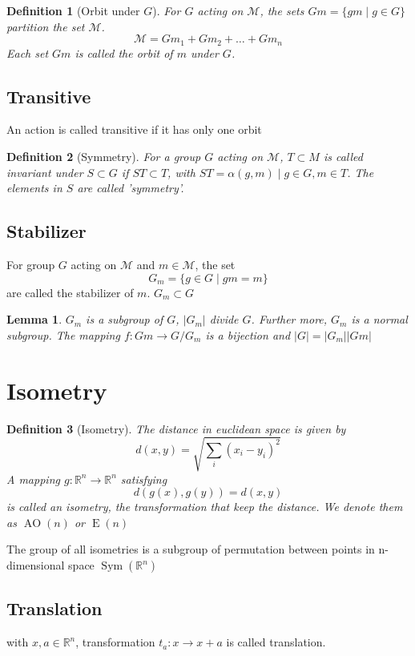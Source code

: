 \documentclass{amsart}
\newcommand{\setM}{\mathcal{M}}
\newtheorem{definition}{Definition}
\newtheorem{lemma}{Lemma}
\DeclareMathOperator{\AO}{AO}
\DeclareMathOperator{\E}{E}
\DeclareMathOperator{\Sym}{Sym}
\begin{document}
\begin{definition}
    [Orbit under $G$]
    For $G$ acting on $\setM$, the sets $Gm = \{gm\mid g\in G\}$ partition the set $\setM$. 
    \[\setM = Gm_1 + Gm_2 + \dots + Gm_n\]
    Each set $Gm$ is called the orbit of $m$ under $G$.
\end{definition}

\subsection*{Transitive}
An action is called transitive if it has only one orbit

\begin{definition}
    [Symmetry]
    For a group $G$ acting on $\setM$, $T\subset M$ is called invariant under $S \subset G$ if $ST\subset T$, 
    with $ST = {\alpha(g,m)\mid g \in G, m\in T}$. 
    The elements in $S$ are called 'symmetry'.
\end{definition}

\subsection*{Stabilizer}
For group $G$ acting on $\setM$ and $m \in \setM$, the set 
\[G_m = \{ g\in G\mid gm = m \}\]
are called the stabilizer of $m$. $G_m \subset G$

\begin{lemma}
    $G_m$ is a subgroup of $G$, $|G_m|$ divide $G$. Further more, $G_m$ is a normal subgroup. 
    The mapping $f\colon Gm \to G/G_m$ is a bijection and $|G|=|G_m||Gm|$
\end{lemma}

\section{Isometry}

\begin{definition}
    [Isometry]
    The distance in euclidean space is given by 
    \[
        d(x,y) = \sqrt{\sum_i(x_i-y_i)^2}    
    \]
    A mapping $g\colon \mathbb{R}^n \to \mathbb{R}^n$ satisfying 
    \[
        d(g(x),g(y)) = d(x,y)    
    \] is called an isometry, the transformation that keep the distance. We denote them as $\AO(n)$ or $\E(n)$
\end{definition}
The group of all isometries is a subgroup of permutation between points in n-dimensional space $\Sym(\mathbb{R}^n)$

\subsection*{Translation}
with $x, a \in \mathbb{R}^n$, transformation $t_a\colon x \to x+a$ is called translation.
\end{document}
